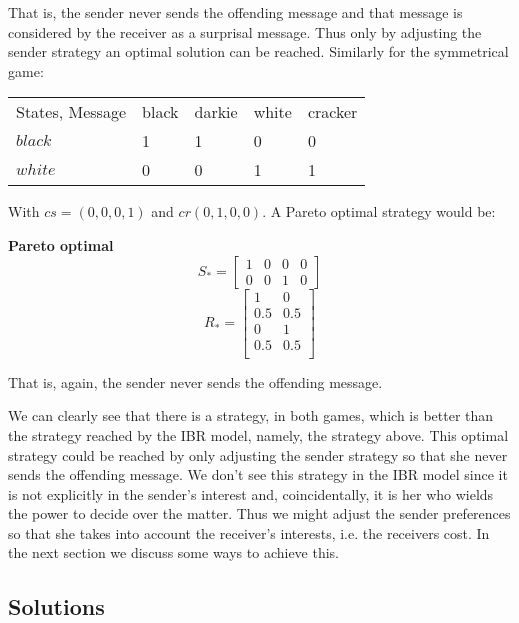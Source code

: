 \documentclass{article}
\begin{document}
That is, the sender never sends the offending message and that message is considered by the receiver as a surprisal message. Thus only by adjusting the sender strategy an optimal solution can be reached. Similarly for the symmetrical game:

\begin{table}[h]
\centering
\begin{tabular}{lllll}
States, Message & black & darkie & white & cracker \\
$black$  & 1      & 1    & 0        & 0   \\
$white$  & 0     & 0   & 1       & 1
\end{tabular}
\end{table}

With $cs=(0,0,0,1)$ and $cr(0,1,0,0)$. A Pareto optimal strategy would be:

\textbf{Pareto optimal}\\
\begin{equation*}
S_*=
\begin{bmatrix}
1 & 0 & 0 & 0\\
0 & 0 & 1 & 0
\end{bmatrix}
\end{equation*}
\begin{equation*}
R_*=
\begin{bmatrix}
1 & 0\\
0.5 & 0.5 \\
0 & 1\\
0.5 & 0.5 \\
\end{bmatrix}
\end{equation*}

That is, again, the sender never sends the offending message.

We can clearly see that there is a strategy, in both games, which is better than the strategy reached by the IBR model, namely, the strategy above. This optimal strategy could be reached by only adjusting the sender strategy so that she never sends the offending message. We don't see this strategy in the IBR model since it is not explicitly in the sender's interest and, coincidentally, it is her who wields the power to decide over the matter. Thus we might adjust the sender preferences so that she takes into account the receiver's interests, i.e. the receivers cost. In the next section we discuss some ways to achieve this.\\

\subsection{Solutions}
\end{document}
